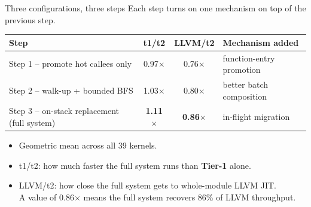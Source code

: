 \documentclass[aspectratio=169,11pt]{beamer}
\newcommand{\tone}{\textbf{\textcolor{tier1}{Tier-1}}}
\newcommand{\code}[1]{{\ttfamily\small #1}}
\begin{document}
\begin{frame}{Three configurations, three steps}
  Each step turns on one mechanism on top of the previous step.

  \vspace{0.5em}
  \centering
  \small
  \begin{tabular}{lccl}
    \toprule
    Step & \code{t1/t2} & \code{LLVM/t2} & Mechanism added \\
    \midrule
    Step 1 -- promote hot callees only           & 0.97$\times$ & 0.76$\times$ & function-entry promotion \\
    Step 2 -- walk-up + bounded BFS              & 1.03$\times$ & 0.80$\times$ & better batch composition  \\
    Step 3 -- on-stack replacement (full system) & \textbf{1.11$\times$} & \textbf{0.86$\times$} & in-flight migration \\
    \bottomrule
  \end{tabular}

  \vspace{0.8em}
  \begin{itemize}\setlength{\itemsep}{2pt}
    \item Geometric mean across all 39 kernels.
    \item \code{t1/t2}: how much faster the full system runs than \tone{} alone.
    \item \code{LLVM/t2}: how close the full system gets to whole-module LLVM JIT.\\
      A value of 0.86$\times$ means the full system recovers 86\% of LLVM throughput.
  \end{itemize}
\end{frame}
\end{document}
